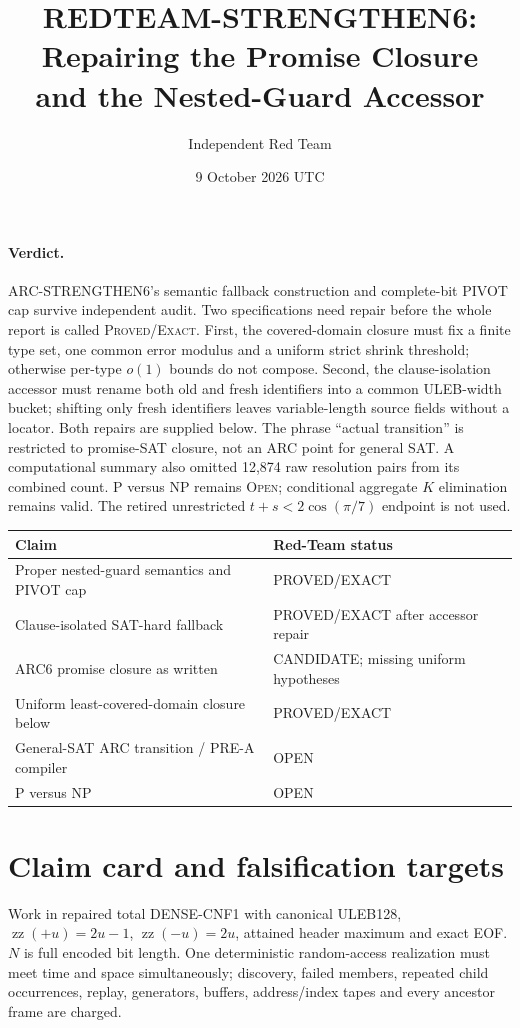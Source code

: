 \documentclass[11pt]{article}
\title{REDTEAM-STRENGTHEN6: Repairing the Promise Closure\\and the Nested-Guard Accessor}
\author{Independent Red Team}
\date{9 October 2026 UTC}
\begin{document}
\sloppy\maketitle

\paragraph{Verdict.}
ARC-STRENGTHEN6's semantic fallback construction and complete-bit PIVOT cap
survive independent audit.  Two specifications need repair before the whole
report is called \textsc{Proved/Exact}.  First, the covered-domain closure
must fix a finite type set, one common error modulus and a uniform strict
shrink threshold; otherwise per-type $o(1)$ bounds do not compose.  Second,
the clause-isolation accessor must rename both old and fresh identifiers into
a common ULEB-width bucket; shifting only fresh identifiers leaves
variable-length source fields without a locator.  Both repairs are supplied
below.  The phrase ``actual transition'' is restricted to promise-SAT
closure, not an ARC point for general SAT.  A computational summary also
omitted 12,874 raw resolution pairs from its combined count.  P versus NP
remains \textsc{Open}; conditional aggregate $K$ elimination remains valid.
The retired unrestricted $t+s<2\cos(\pi/7)$ endpoint is not used.

\begin{center}
\begin{tabular}{@{}ll@{}}
\toprule
Claim & Red-Team status\\\midrule
Proper nested-guard semantics and PIVOT cap & PROVED/EXACT\\
Clause-isolated SAT-hard fallback & PROVED/EXACT after accessor repair\\
ARC6 promise closure as written & CANDIDATE; missing uniform hypotheses\\
Uniform least-covered-domain closure below & PROVED/EXACT\\
General-SAT ARC transition / PRE-A compiler & OPEN\\
P versus NP & OPEN\\\bottomrule
\end{tabular}
\end{center}

\section{Claim card and falsification targets}
Work in repaired total DENSE-CNF1 with canonical ULEB128,
$\operatorname{zz}(+u)=2u-1$, $\operatorname{zz}(-u)=2u$, attained header
maximum and exact EOF.  $N$ is full encoded bit length.  One deterministic
random-access realization must meet time and space simultaneously; discovery,
failed members, repeated child occurrences, replay, generators, buffers,
address/index tapes and every ancestor frame are charged.
\end{document}
